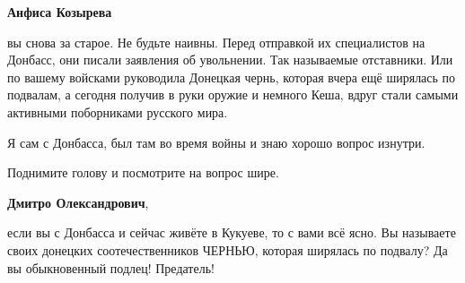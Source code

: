 \begin{itemize}
\begin{itemize}
 
\textbf{Анфиса Козырева} 

вы снова за старое. Не будьте наивны. Перед отправкой их специалистов на
Донбасс, они писали заявления об увольнении. Так называемые отставники. Или по
вашему войсками руководила Донецкая чернь, которая вчера ещё ширялась по
подвалам, а сегодня получив в руки оружие и немного Кеша, вдруг стали самыми
активными поборниками русского мира.

Я сам с Донбасса, был там во время войны и знаю хорошо вопрос изнутри.

Поднимите голову и посмотрите на вопрос шире.


 
\textbf{Дмитро Олександрович}, 

если вы с Донбасса и сейчас живёте в Кукуеве, то с вами всё ясно. Вы называете
своих донецких соотечественников ЧЕРНЬЮ, которая ширялась по подвалу? Да вы
обыкновенный подлец! Предатель!
\end{itemize}

\end{itemize}

